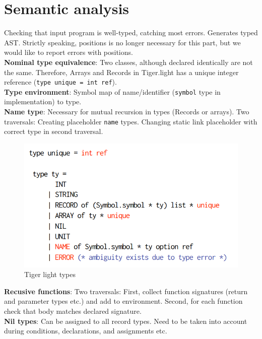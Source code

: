 \section{Semantic analysis}

Checking that input program is well-typed, catching most errors. Generates typed AST. Strictly speaking, positions is no longer necessary for this part, but we would like to report errors with positions.\\

\textbf{Nominal type equivalence}: Two classes, although declared identically are not the same. Therefore, Arrays and Records in Tiger.light has a unique integer reference (\texttt{type unique = int ref}).\\

\textbf{Type environment}: Symbol map of name/identifier (\texttt{symbol} type in implementation) to type.\\

\textbf{Name type}: Necessary for mutual recursion in types (Records or arrays). Two traversals: Creating placeholder \texttt{name} types. Changing static link placeholder with correct type in second traversal.

\begin{figure}[h]
    \centering
    \includegraphics[scale=0.5]{assets/tigerlight_types.PNG}
    \caption{Tiger light types}
    \label{tiger_types}
\end{figure}

\textbf{Recusive functions}: Two traversals: First, collect function signatures (return and parameter types etc.) and add to environment. Second, for each function check that body matches declared signature.\\

\textbf{Nil types}: Can be assigned to all record types. Need to be taken into account during conditions, declarations, and assignments etc.

